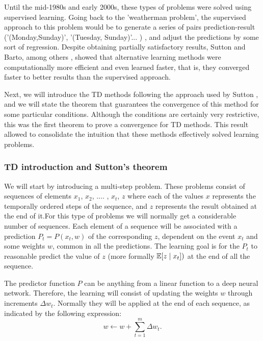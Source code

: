 \documentclass[12pt]{article}
\numberwithin{equation}{section}
\begin{document}
 Until the mid-1980s and early 2000s, these types of problems were solved using supervised learning. Going back to the 'weatherman problem', the supervised approach to this problem would be to generate a series of pairs prediction-result ('(Monday,Sunday)', '(Tuesday, Sunday)'... ) , and adjust the predictions by some sort  of regression. Despite obtaining partially satisfactory results, Sutton and Barto, among others\cite{sutton1988learning} \cite{sutton1992gain} \cite{sutton1992reinforcement},  showed that alternative learning methods were computationally more efficient and even learned faster, that is, they converged faster to better results than the supervised approach.




Next, we will introduce the TD methods following the approach used by Sutton \cite{sutton1988learning}, and we will state the  theorem that guarantees the convergence of this method for some particular conditions. Although the conditions are certainly very restrictive, this was the first theorem to prove a convergence for TD methods. This result allowed  to consolidate the intuition that these methods effectively solved learning problems.


\subsubsection{TD introduction and Sutton's theorem} \hspace{3mm}





 We will start by introducing a multi-step problem. These problems consist of sequences of elements $x_1$,
 $x_2$, .... , $x_t$, $z$ where each of the values $x$ represents the temporally ordered steps of the sequence, and $z$ represents the result obtained at the end of it.For this type of problems we will normally get a considerable number of sequences. Each element of a sequence will be associated with a prediction $P_t=P(x_t,w)$ of the corresponding $z$, dependent on the event $x_t$ and some weights $w$, common in all the predictions. The learning goal is for the $P_t$  to 
 reasonable predict the value of $z$ (more formally $\mathbb{E}[z \hspace{1mm}| \hspace{1mm} x_t])$ at the end of  all the sequence.


 The predictor function $P$ can be anything from a linear function to a deep neural network. Therefore, the learning will consist of updating the weights $w$ through increments $\Delta w_t$. Normally they will be applied at the end of each sequence, as indicated by the following expression:
\begin{equation}
    w \longleftarrow w+ \sum_{t=1}^{m}\Delta w_t.
\end{equation}
\end{document}
